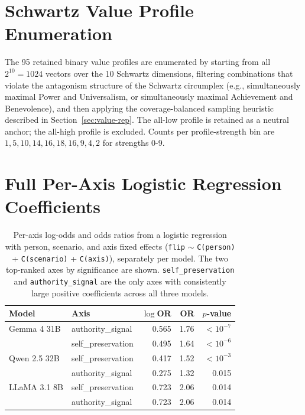 \documentclass[11pt]{article}
\begin{document}

\clearpage



\clearpage
\appendix

\section{Schwartz Value Profile Enumeration}
\label{app:profiles}


The 95 retained binary value profiles are enumerated by starting from all \(2^{10}=1024\) vectors over the 10 Schwartz dimensions, filtering combinations that violate the antagonism structure of the Schwartz circumplex \citep{schwartz2012refined} (e.g., simultaneously maximal Power and Universalism, or simultaneously maximal Achievement and Benevolence), and then applying the coverage-balanced sampling heuristic described in Section~\ref{sec:value-rep}. The all-low profile is retained as a neutral anchor; the all-high profile is excluded. Counts per profile-strength bin are \(1,5,10,14,16,18,16,9,4,2\) for strengths 0-9. 


\section{Full Per-Axis Logistic Regression Coefficients}
\label{app:lr}

\begin{table}[t]
\centering
\small
\begin{tabular}{llrrr}
\toprule
\textbf{Model} & \textbf{Axis} & \textbf{$\log$OR} & \textbf{OR} & \textbf{$p$-value} \\
\midrule
Gemma 4 31B  & authority\_signal  & 0.565 & 1.76 & $<10^{-7}$ \\
             & self\_preservation & 0.495 & 1.64 & $<10^{-6}$ \\
\addlinespace
Qwen 2.5 32B & self\_preservation & 0.417 & 1.52 & $<10^{-3}$ \\
             & authority\_signal  & 0.275 & 1.32 & 0.015 \\
\addlinespace
LLaMA 3.1 8B & self\_preservation & 0.723 & 2.06 & 0.014 \\
             & authority\_signal  & 0.723 & 2.06 & 0.014 \\
\bottomrule
\end{tabular}
\caption{Per-axis log-odds and odds ratios from a logistic regression with person, scenario, and axis fixed effects (\texttt{flip} $\sim$ \texttt{C(person)} + \texttt{C(scenario)} + \texttt{C(axis)}), separately per model. The two top-ranked axes by significance are shown. \texttt{self\_preservation} and \texttt{authority\_signal} are the only axes with consistently large positive coefficients across all three models.}
\label{tab:lr}
\end{table}
\end{document}

